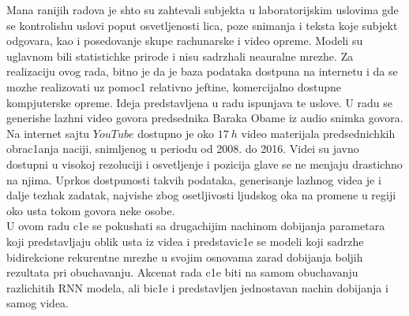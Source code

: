 \documentclass[a4paper, openany, oneside, 11pt]{book}
\begin{document}
Mana ranijih radova je shto su zahtevali subjekta u laboratorijskim uslovima gde se kontrolishu uslovi poput osvetljenosti lica, poze snimanja i teksta koje subjekt odgovara, kao i posedovanje skupe rachunarske i video opreme. Modeli su uglavnom bili statistichke prirode i nisu sadrzhali neauralne mrezhe. Za realizaciju ovog rada, bitno je da je baza podataka dostpuna na internetu i da se mozhe realizovati uz pomoc1 relativno jeftine, komercijalno dostupne kompjuterske opreme. Ideja predstavljena u radu \cite{deepfake2} ispunjava te uslove. U radu se generishe lazhni video govora predsednika Baraka Obame iz audio snimka govora. Na internet sajtu $YouTube$ dostupno je oko $\SI{17}{h}$ video materijala predsednichkih obrac1anja naciji, snimljenog u periodu od 2008. do 2016. Videi su javno dostupni u visokoj rezoluciji i osvetljenje i pozicija glave se ne menjaju drastichno na njima. Uprkos dostpunosti takvih podataka, generisanje lazhnog videa je i dalje tezhak zadatak, najvishe zbog osetljivosti ljudskog oka na promene u regiji oko usta tokom govora neke osobe.\\
U ovom radu c1e se pokushati sa drugachijim nachinom dobijanja parametara koji predstavljaju oblik usta iz videa i predstavic1e se modeli koji sadrzhe bidirekcione rekurentne mrezhe u svojim osnovama zarad dobijanja boljih rezultata pri obuchavanju. Akcenat rada c1e biti na samom obuchavanju razlichitih \acrshort{RNN} modela, ali bic1e i predstavljen jednostavan nachin dobijanja i samog videa.\\
\end{document}
